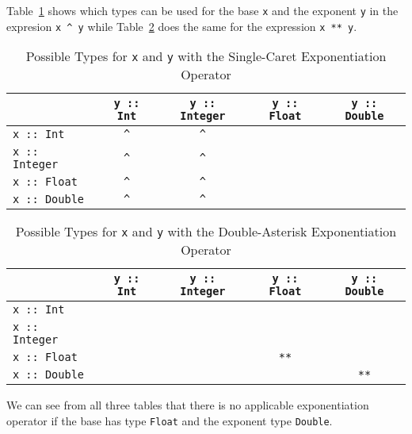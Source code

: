 
Table~\ref{tbl8_9_1} shows which types can be used for the base \verb|x| and the exponent
\verb|y| in the expresion \verb|x ^ y| while Table~\ref{tbl8_9_2} does the same for the
expression \verb|x ** y|.

\begin{table}[!ht]
    \begin{tabular}{ l | c c c c }
        \hline
        \quad & \verb|y :: Int| & \verb|y :: Integer| & \verb|y :: Float| 
        & \verb|y :: Double| \\
        \hline
        \verb|x :: Int| & \verb|^| & \verb|^| & \quad & \quad \\
        \verb|x :: Integer| & \verb|^| & \verb|^| & \quad & \quad \\
        \verb|x :: Float| & \verb|^| & \verb|^| & \quad & \quad \\
        \verb|x :: Double| & \verb|^| & \verb|^| & \quad & \quad \\
        \hline
    \end{tabular}
    \caption{Possible Types for \texttt{x} and \texttt{y} with the Single-Caret 
    Exponentiation Operator \label{tbl8_9_1}}
\end{table}

\begin{table}[!ht]
    \begin{tabular}{ l | c c c c }
        \hline
        \quad & \verb|y :: Int| & \verb|y :: Integer| & \verb|y :: Float| 
        & \verb|y :: Double| \\
        \hline
        \verb|x :: Int| & \quad & \quad & \quad & \quad \\
        \verb|x :: Integer| & \quad & \quad & \quad & \quad \\
        \verb|x :: Float| & \quad & \quad & \verb|**| & \quad \\
        \verb|x :: Double| & \quad & \quad & \quad & \verb|**| \\
        \hline
    \end{tabular}
    \caption{Possible Types for \texttt{x} and \texttt{y} with the Double-Asterisk
    Exponentiation Operator \label{tbl8_9_2}}
\end{table}

We can see from all three tables that there is no applicable exponentiation 
operator if the base has type \verb|Float| and the exponent type \verb|Double|.
